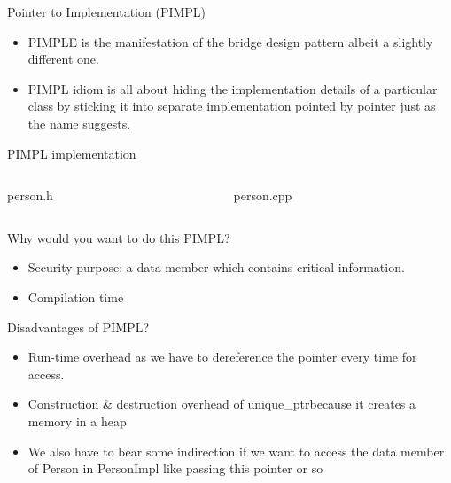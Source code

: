 \documentclass[13pt]{beamer}
\begin{document}
\begin{frame}{Pointer to Implementation (PIMPL)}
	\textcolor{blue}{}
	\begin{itemize}
		\setlength\itemsep{1em}
		\item PIMPLE is the manifestation of the bridge design pattern albeit a slightly different one.
		\item PIMPL idiom is all about hiding the implementation details of a particular class by sticking it into separate implementation pointed by pointer just as the name suggests.
	\end{itemize}
\end{frame}

\begin{frame}{PIMPL implementation}
\begin{columns}[T]
\begin{column}{.45\textwidth}
\lstset{basicstyle=\tiny,style=myCustomCppStyle}
person.h

\end{column}

\begin{column}{.45\textwidth}
\lstset{basicstyle=\tiny,style=myCustomCppStyle}
person.cpp

\end{column}
\end{columns}
\end{frame}

\begin{frame}{Why would you want to do this PIMPL?}
	\textcolor{blue}{}
	\begin{itemize}
		\setlength\itemsep{1em}
		\item Security purpose: a data member which contains critical information.
		\item Compilation time
	\end{itemize}
\end{frame}

\begin{frame}{Disadvantages of PIMPL?}
	\textcolor{blue}{}
	\begin{itemize}
		\setlength\itemsep{1em}
		\item Run-time overhead as we have to dereference the pointer every time for access.
		\item Construction \& destruction overhead of unique\_ptrbecause it creates a memory in a heap
		\item We also have to bear some indirection if we want to access the data member of Person in PersonImpl like passing this pointer or so
	\end{itemize}
\end{frame}
\end{document}
